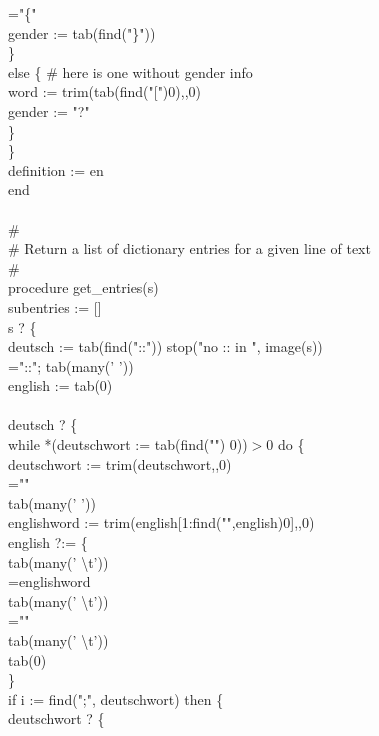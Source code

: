 {\>\>\>="\{" \\
\>\>\>gender := tab(find("\}")) \\
\>\>\>\} \\
\>\>else \{ \# here is one without gender info \\
\>\>\>word := trim(tab(find("["){\textbar}0),,0) \\
\>\>\>gender := "?" \\
\>\>\>\} \\
\>\>\} \\
\>definition := en \\
end \\
\ \\
\# \\
\# Return a list of dictionary entries for a given line of text \\
\# \\
procedure get\_entries(s) \\
\>subentries := [] \\
\>s ? \{ \\
\>\>deutsch := tab(find("::")) {\textbar} stop("no :: in ", image(s)) \\
\>\>="::"; tab(many(' ')) \\
\>\>english := tab(0) \\
\>\>\ \\
\>\>deutsch ? \{ \\
\>\>\>while *(deutschwort := tab(find("{\textbar}") {\textbar} 0))$>$0 do \{ \\
\>\>\>\>deutschwort := trim(deutschwort,,0) \\
\>\>\>\>="{\textbar}" \\
\>\>\>\>tab(many(' ')) \\
\>\>\>\>englishword := trim(english[1:find("{\textbar}",english){\textbar}0],,0) \\
\>\>\>\>english ?:= \{ \\
\>\>\>\>\>tab(many(' {\textbackslash}t')) \\
\>\>\>\>\>=englishword \\
\>\>\>\>\>tab(many(' {\textbackslash}t')) \\
\>\>\>\>\>="{\textbar}" \\
\>\>\>\>\>tab(many(' {\textbackslash}t')) \\
\>\>\>\>\>tab(0) \\
\>\>\>\>\>\} \\
\>\>\>\>if i := find(";", deutschwort) then \{ \\
\>\>\>\>\>deutschwort ? \{ \\
}
